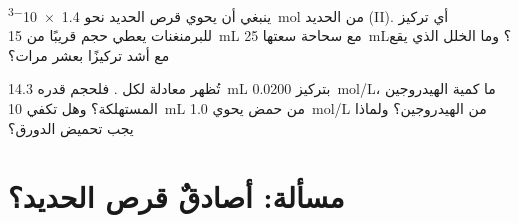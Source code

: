 \begin{exercise}[$\star\star\star$]\label{exo:g11:titration:14}
ينبغي أن يحوي قرص الحديد نحو \qty{1.4e-3}{mol} من الحديد (II). أي
تركيز للبرمنغنات يعطي حجم  قريبًا من
\qty{15}{mL} مع سحاحة سعتها \qty{25}{mL}؟ وما الخلل الذي يقع مع
 أشد تركيزًا بعشر مرات؟
\end{exercise}

\begin{exercise}[$\star\star\star$]\label{exo:g11:titration:15}
تُظهر معادلة   لكل . فلحجم
 قدره \qty{14.3}{mL} بتركيز \qty{0.0200}{mol/L}، ما كمية
 الهيدروجين المستهلكة؟ وهل تكفي \qty{10}{mL} من حمض يحوي
\qty{1.0}{mol/L} من  الهيدروجين؟ ولماذا يجب تحميض
الدورق؟
\end{exercise}

\section{مسألة: أصادقٌ قرص الحديد؟}

